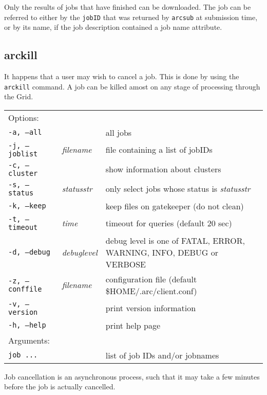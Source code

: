 Only the results of jobs that have finished can be downloaded. The job
can be referred to either by the \texttt{jobID} that was returned by
\texttt{arcsub} at submission time, or by its name, if the job
description contained a job name attribute.

\subsection{arckill}
\label{sec:arckill}

It happens that a user may wish to cancel a job. This is done by using
the \texttt{arckill}  command. A
job can be killed amost on any stage of processing through the Grid.

\hspace*{0.5cm}
\begin{shaded}
\end{shaded}
\begin{longtable}{llp{8cm}}
   Options:&&\\
   \texttt{-a, --all}& & all jobs\\
   \texttt{-j, --joblist}& \textit{filename} & file containing a list of jobIDs\\
   \texttt{-c, --cluster}& & show information about clusters\\
   \texttt{-s, --status}& \textit{statusstr} &only select jobs whose status is \textit{statusstr}\\
   \texttt{-k, --keep}& & keep files on gatekeeper (do not clean)\\
   \texttt{-t, --timeout}& \textit{time} & timeout for queries (default 20 sec)\\
   \texttt{-d, --debug}& \textit{debuglevel}&debug level is one of  FATAL, ERROR, WARNING, INFO, DEBUG or VERBOSE\\
   \texttt{-z, --conffile}&\textit{filename}& configuration file (default {\$}HOME/.arc/client.conf)\\
   \texttt{-v, --version}& & print version information\\
   \texttt{-h, --help}& & print help page\\
   Arguments:&&\\
   \texttt{job ...} && list of job IDs and/or jobnames\\
\end{longtable}

\begin{framed}
   Job cancellation is an asynchronous process, such that it
   may take a few minutes before the job is actually cancelled.
\end{framed}

